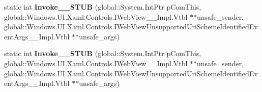 \begin{DoxyCompactItemize}
\item 
\mbox{\label{struct_windows_1_1_foundation_1_1_typed_event_handler___a___windows___u_i___xaml___controls___we2ca8d6ce2726bd3be0205817ae158dc8_a3fcd56dcdbb64b1d34cf075e65d2460f}} 
static int {\bfseries Invoke\+\_\+\+\_\+\+S\+T\+UB} (global\+::\+System.\+Int\+Ptr p\+Com\+This, global\+::\+Windows.\+U\+I.\+Xaml.\+Controls.\+I\+Web\+View\+\_\+\+\_\+\+Impl.\+Vtbl $\ast$$\ast$unsafe\+\_\+sender, global\+::\+Windows.\+U\+I.\+Xaml.\+Controls.\+I\+Web\+View\+Unsupported\+Uri\+Scheme\+Identified\+Event\+Args\+\_\+\+\_\+\+Impl.\+Vtbl $\ast$$\ast$unsafe\+\_\+args)
\item 
\mbox{\label{struct_windows_1_1_foundation_1_1_typed_event_handler___a___windows___u_i___xaml___controls___we2ca8d6ce2726bd3be0205817ae158dc8_a3fcd56dcdbb64b1d34cf075e65d2460f}} 
static int {\bfseries Invoke\+\_\+\+\_\+\+S\+T\+UB} (global\+::\+System.\+Int\+Ptr p\+Com\+This, global\+::\+Windows.\+U\+I.\+Xaml.\+Controls.\+I\+Web\+View\+\_\+\+\_\+\+Impl.\+Vtbl $\ast$$\ast$unsafe\+\_\+sender, global\+::\+Windows.\+U\+I.\+Xaml.\+Controls.\+I\+Web\+View\+Unsupported\+Uri\+Scheme\+Identified\+Event\+Args\+\_\+\+\_\+\+Impl.\+Vtbl $\ast$$\ast$unsafe\+\_\+args)
\end{DoxyCompactItemize}
